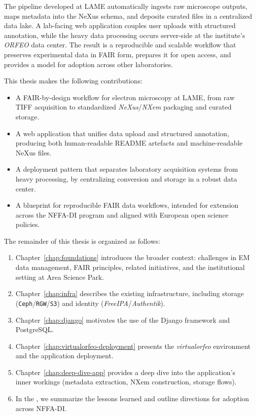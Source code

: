 The pipeline developed at LAME automatically ingests raw microscope outputs, maps metadata into the NeXus schema, and deposits curated files in a centralized data lake. 
A lab-facing web application couples user uploads with structured annotation, while the heavy data processing occurs server-side at the institute’s \textit{ORFEO} data center. 
The result is a reproducible and scalable workflow that preserves experimental data in FAIR form, prepares it for open access, and provides a model for adoption across other laboratories.

\medskip
\noindent This thesis makes the following contributions:
\begin{itemize}
	\item A FAIR-by-design workflow for electron microscopy at LAME, from raw TIFF acquisition to standardized \textit{NeXus}/\textit{NXem} packaging and curated storage.
	\item A web application that unifies data upload and structured annotation, producing both human-readable README artefacts and machine-readable NeXus files.
	\item A deployment pattern that separates laboratory acquisition systems from heavy processing, by centralizing conversion and storage in a robust data center.
	\item A blueprint for reproducible FAIR data workflows, intended for extension across the NFFA-DI program and aligned with European open science policies.
\end{itemize}

\medskip
\noindent The remainder of this thesis is organized as follows:
\begin{enumerate}
	\item Chapter~\ref{chap:foundations} introduces the broader context: challenges in EM data management, FAIR principles, related initiatives, and the institutional setting at Area Science Park. 
	\item Chapter~\ref{chap:infra} describes the existing infrastructure, including storage (\texttt{Ceph}/\texttt{RGW}/\texttt{S3}) and identity (\textit{FreeIPA}/\textit{Authentik}). 
	\item Chapter~\ref{chap:django} motivates the use of the Django framework and PostgreSQL. 
	\item Chapter~\ref{chap:virtualorfeo-deployment} presents the \textit{virtualorfeo} environment and the application deployment. 
	\item Chapter~\ref{chap:deep-dive-app} provides a deep dive into the application’s inner workings (metadata extraction, NXem construction, storage flows). 
	\item In the , we summarize the lessons learned and outline directions for adoption across NFFA-DI.
\end{enumerate}

